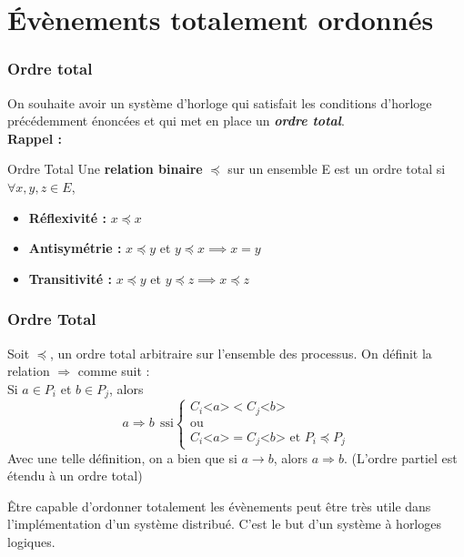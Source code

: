 \documentclass[compress]{beamer}
\begin{document}
\section{\'Evènements totalement ordonnés}
\begin{frame}
\frametitle{Ordre total}
On souhaite avoir un système d'horloge qui satisfait les conditions d'horloge précédemment énoncées et qui met en place un \textit{\textbf{ordre total}}.\\
\textbf{Rappel : }
\begin{block}{Ordre Total}
Une \textbf{relation binaire} $\preceq$ sur un ensemble E est un ordre total si $\forall x, y, z \in E$, \\
\begin{itemize}
\item \textbf{Réflexivité :} $x \preceq x$
\item \textbf{Antisymétrie :} $x \preceq y$ et $y \preceq x \implies x = y$
\item \textbf{Transitivité :} $x \preceq y$ et $y \preceq z \implies x \preceq z$
\end{itemize}
\end{block}
\end{frame}

\begin{frame}
\frametitle{Ordre Total}
Soit $\preceq$, un ordre total arbitraire sur l'ensemble des processus. On définit la relation $\Rightarrow$ comme suit :\\
Si $a \in P_i$ et $b \in P_j$, alors \\
\[
	a \Rightarrow b \ \ \text{ssi}
	\begin{cases}
		C_i \text{<}a\text{>} < C_j\text{<}b\text{>} \\
		\text{ou}\\
		C_i\text{<}a\text{>} = C_j\text{<}b\text{>} \text{ et } P_i \preceq P_j
	\end{cases}
\]
Avec une telle définition, on a bien que si $a \rightarrow b$, alors $a \Rightarrow b$. (L'ordre partiel est étendu à un ordre total)
\vspace{.5in}

\^Etre capable d'ordonner totalement les évènements peut être très utile dans l'implémentation d'un système distribué. C'est le but d'un système à horloges logiques.
\end{frame}
\end{document}
